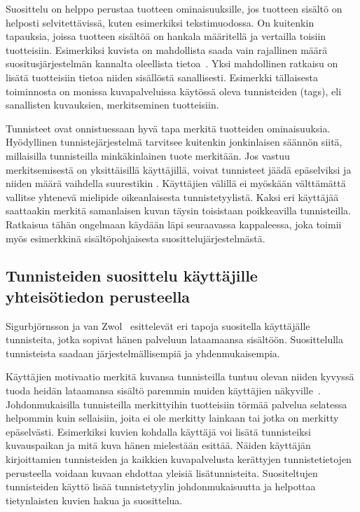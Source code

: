 \documentclass[12pt,finnish]{tktltiki2}
\theoremstyle{definition}
\theoremstyle{remark}
\begin{document}
Suosittelu on helppo perustaa tuotteen ominaisuuksille, jos tuotteen sisältö on helposti selvitettävissä, kuten esimerkiksi tekstimuodossa. On kuitenkin tapauksia, joissa tuotteen sisältöä on hankala määritellä ja vertailla toisiin tuotteisiin. Esimerkiksi kuvista on mahdollista saada vain rajallinen määrä suositusjärjestelmän kannalta oleellista tietoa~\cite{Sigurbjornsson:2008:FTR:1367497.1367542}. Yksi mahdollinen ratkaisu on lisätä tuotteisiin tietoa niiden sisällöstä sanallisesti. Esimerkki tällaisesta toiminnosta on monissa kuvapalveluissa käytössä oleva tunnisteiden (tags), eli sanallisten kuvauksien, merkitseminen tuotteisiin.

Tunnisteet ovat onnistuessaan hyvä tapa merkitä tuotteiden ominaisuuksia. Hyödyllinen tunnistejärjestelmä tarvitsee kuitenkin jonkinlaisen säännön siitä, millaisilla tunnisteilla minkäkinlainen tuote merkitään. Jos vastuu merkitsemisestä on yksittäisillä käyttäjillä, voivat tunnisteet jäädä epäselviksi ja niiden määrä vaihdella suurestikin \cite{Sigurbjornsson:2008:FTR:1367497.1367542}. Käyttäjien välillä ei myöskään välttämättä vallitse yhtenevä mielipide oikeanlaisesta tunnistetyylistä. Kaksi eri käyttäjää saattaakin merkitä samanlaisen kuvan täysin toisistaan poikkeavilla tunnisteilla. Ratkaisua tähän ongelmaan käydään läpi seuraavassa kappaleessa, joka toimii myös esimerkkinä sisältöpohjaisesta suosittelujärjestelmästä.


\subsection{Tunnisteiden suosittelu käyttäjille yhteisötiedon perusteella}

Sigurbjörnsson ja van Zwol~\cite{Sigurbjornsson:2008:FTR:1367497.1367542} esittelevät eri tapoja suositella käyttäjälle tunnisteita, jotka sopivat hänen palveluun lataamaansa sisältöön. Suosittelulla tunnisteista saadaan järjestelmällisempiä ja yhdenmukaisempia.

Käyttäjien motivaatio merkitä kuvansa tunnisteilla tuntuu olevan niiden kyvyssä tuoda heidän lataamansa sisältö paremmin muiden käyttäjien näkyville~\cite{Ames:2007:WWT:1240624.1240772}. Johdonmukaisilla tunnisteilla merkittyihin tuotteisiin törmää palvelua selatessa helpommin kuin sellaisiin, joita ei ole merkitty lainkaan tai jotka on merkitty epäselvästi. Esimerkiksi kuvien kohdalla käyttäjä voi lisätä tunnisteiksi kuvauspaikan ja mitä kuva hänen mielestään esittää. Näiden käyttäjän kirjoittamien tunnisteiden ja kaikkien kuvapalvelusta kerättyjen tunnistetietojen perusteella voidaan kuvaan ehdottaa yleisiä lisätunnisteita. Suositeltujen tunnisteiden käyttö lisää tunnistetyylin johdonmukaisuutta ja helpottaa tietynlaisten kuvien hakua ja suosittelua.
\end{document}
